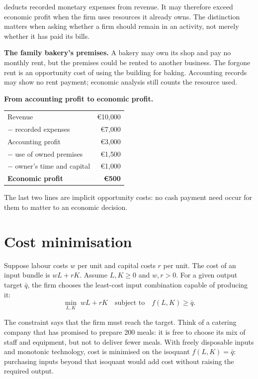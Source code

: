  deducts recorded monetary expenses from revenue. It may therefore exceed economic profit when the firm uses resources it already owns. The distinction matters when asking whether a firm should remain in an activity, not merely whether it has paid its bills.

\begin{exercisebox}
\textbf{The family bakery's premises.}
A bakery may own its shop and pay no monthly rent, but the premises could be
rented to another business. The forgone rent is an opportunity cost of using
the building for baking. Accounting records may show no rent payment; economic
analysis still counts the resource used.
\end{exercisebox}

\begin{keyidea}
\textbf{From accounting profit to economic profit.}
\begin{center}
\begin{tabular}{lr}
\toprule
Revenue & \euro10{,}000 \\
$-$ recorded expenses & \euro7{,}000 \\
\midrule
Accounting profit & \euro3{,}000 \\
$-$ use of owned premises & \euro1{,}500 \\
$-$ owner's time and capital & \euro1{,}000 \\
\midrule
\textbf{Economic profit} & \textbf{\euro500} \\
\bottomrule
\end{tabular}
\end{center}
The last two lines are implicit opportunity costs: no cash payment need occur
for them to matter to an economic decision.
\end{keyidea}

\section{Cost minimisation}

Suppose labour costs $w$ per unit and capital costs $r$ per unit. The cost of
an input bundle is $wL+rK$. Assume $L,K\geq0$ and $w,r>0$. For a given output
target $\bar q$, the firm chooses the least-cost input combination capable of
producing it:
\[
\min_{L,K}\; wL+rK
\quad\text{subject to}\quad f(L,K)\geq \bar q.
\]

The constraint says that the firm must reach the target. Think of a catering
company that has promised to prepare 200 meals: it is free to choose its mix of
staff and equipment, but not to deliver fewer meals. With freely disposable
inputs and monotonic technology, cost is minimised on the isoquant
$f(L,K)=\bar q$: purchasing inputs beyond that isoquant would add cost without
raising the required output.

